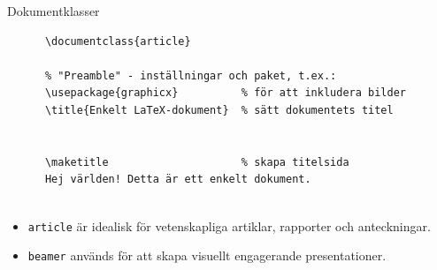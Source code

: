 \begin{Slide}{Dokumentklasser}\SlideFontSmall
  \begin{itemize}
  \end{itemize}

  \blankline
    \begin{lstlisting}[style=latexex]
      % Exempel på användning av dokumentklassen article
      \documentclass{article}

      % "Preamble" - inställningar och paket, t.ex.:
      \usepackage{graphicx}          % för att inkludera bilder
      \title{Enkelt LaTeX-dokument}  % sätt dokumentets titel

      
      \maketitle                     % skapa titelsida
      Hej världen! Detta är ett enkelt dokument.
      
    \end{lstlisting}

    \begin{itemize}
      \item \texttt{article} är idealisk för vetenskapliga artiklar, rapporter och anteckningar.
      \item \texttt{beamer} används för att skapa visuellt engagerande presentationer.
    \end{itemize}
\end{Slide}

